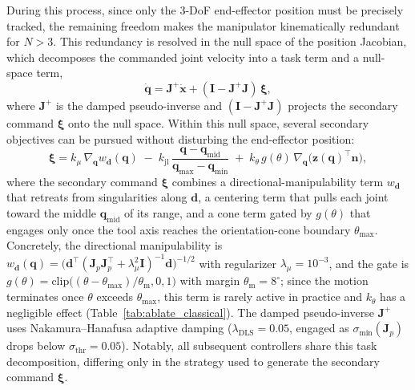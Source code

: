 \documentclass[journal, twoside]{IEEEtran}
\begin{document}
During this process, since only the $3$-DoF end-effector position must be precisely tracked, the remaining freedom makes the manipulator kinematically redundant for $N>3$. This redundancy is resolved in the null space of the position Jacobian, which decomposes the commanded joint velocity into a task term and a null-space term,
\begin{equation}
\label{eq:nullspace}
\dot{\mathbf{q}} = \mathbf{J}^{+}\dot{\mathbf{x}} + (\mathbf{I}-\mathbf{J}^{+}\mathbf{J})\,\boldsymbol{\xi},
\end{equation}
where $\mathbf{J}^{+}$ is the damped pseudo-inverse and $(\mathbf{I}-\mathbf{J}^{+}\mathbf{J})$ projects the secondary command $\boldsymbol{\xi}$ onto the null space. Within this null space, several secondary objectives can be pursued without disturbing the end-effector position:
\begin{equation}
\label{eq:secondary}
\boldsymbol{\xi}=k_{\mu}\,\nabla_{\mathbf{q}}w_{\mathbf{d}}(\mathbf{q})\;-\;k_{\mathrm{jl}}\,\frac{\mathbf{q}-\mathbf{q}_{\mathrm{mid}}}{\mathbf{q}_{\max}-\mathbf{q}_{\min}}\;+\;k_{\theta}\,g(\theta)\,\nabla_{\mathbf{q}}\!\big(\mathbf{z}(\mathbf{q})^{\top}\mathbf{n}\big),
\end{equation}
where the secondary command $\boldsymbol{\xi}$ combines a directional-manipulability term $w_{\mathbf{d}}$ that retreats from singularities along $\mathbf{d}$, a centering term that pulls each joint toward the middle $\mathbf{q}_{\mathrm{mid}}$ of its range, and a cone term gated by $g(\theta)$ that engages only once the tool axis reaches the orientation-cone boundary $\theta_{\max}$. Concretely, the directional manipulability is $w_{\mathbf{d}}(\mathbf{q})=\big(\mathbf{d}^{\top}(\mathbf{J}_{p}\mathbf{J}_{p}^{\top}+\lambda_{\mu}^{2}\mathbf{I})^{-1}\mathbf{d}\big)^{-1/2}$ with regularizer $\lambda_{\mu}=10^{-3}$, and the gate is $g(\theta)=\mathrm{clip}\!\big((\theta-\theta_{\max})/\theta_{\mathrm{m}},0,1\big)$ with margin $\theta_{\mathrm{m}}=8^{\circ}$; since the motion terminates once $\theta$ exceeds $\theta_{\max}$, this term is rarely active in practice and $k_{\theta}$ has a negligible effect (Table~\ref{tab:ablate_classical}). The damped pseudo-inverse $\mathbf{J}^{+}$ uses Nakamura--Hanafusa adaptive damping ($\lambda_{\mathrm{DLS}}=0.05$, engaged as $\sigma_{\min}(\mathbf{J}_{p})$ drops below $\sigma_{\mathrm{thr}}=0.05$). Notably, all subsequent controllers share this task decomposition, differing only in the strategy used to generate the secondary command $\boldsymbol{\xi}$.
\end{document}
